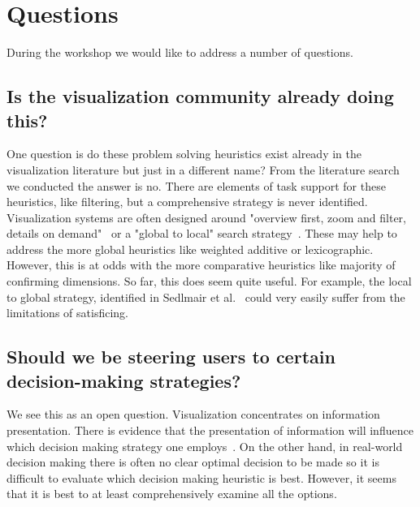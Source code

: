 \section{Questions}\label{questions}

During the workshop we would like to address a number of questions.

\subsection{Is the visualization community already doing this?}
\label{is-vis-already-doing-this}

One question is do these problem solving heuristics exist already in the
visualization literature but just in a different name? From the literature
search we conducted the answer is no. There are elements of task support for
these heuristics, like filtering, but a comprehensive strategy is never
identified. Visualization systems are often designed around 
"overview first, zoom and filter, details on demand"~\cite{Shneiderman:1996} or
a "global to local" search strategy~\cite{Sedlmair:2014}. These may help to
address the more global heuristics like weighted additive or lexicographic.
However, this is at odds with the more comparative heuristics like majority
of confirming dimensions. 
So far, this does seem quite useful. For example, the local to global
strategy, identified in Sedlmair et al.~\citep{Sedlmair:2014} could very
easily suffer from the limitations of satisficing.



\subsection{Should we be steering users to certain decision-making strategies?}

We see this as an open question. Visualization concentrates on information
presentation. There is evidence that the presentation of information will
influence which decision making strategy one employs~\citep{Jarvenpaa:1990}.
On the other hand, in real-world decision making there is often no clear
optimal decision to be made so it is difficult to evaluate which decision
making heuristic is best. However, it seems that it is best to at least
comprehensively examine all the options.

